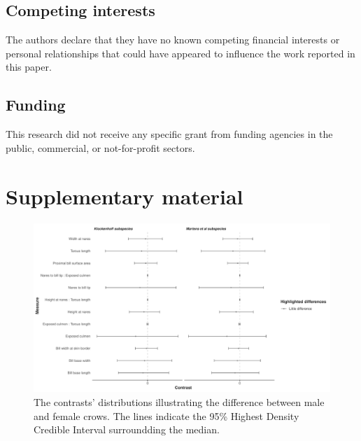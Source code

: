 \documentclass[10pt,a4paper]{article}
\begin{document}
\subsection{Competing interests}\label{competing-interests}

The authors declare that they have no known competing financial interests or personal relationships that could have appeared to influence the work reported in this paper.

\subsection{Funding}\label{funding}

This research did not receive any specific grant from funding agencies in the public, commercial, or not-for-profit sectors.

\clearpage

\section{Supplementary material}\label{supplementary-material}

\begin{figure}
\includegraphics[width=0.9\linewidth]{../Figures/_HDCI_sex_contrasts} \caption{The contrasts' distributions illustrating the difference between male and female crows. The lines indicate the 95\% Highest Density Credible Interval surroundding the median.}\label{fig:sexContrasts}
\end{figure}
\end{document}
